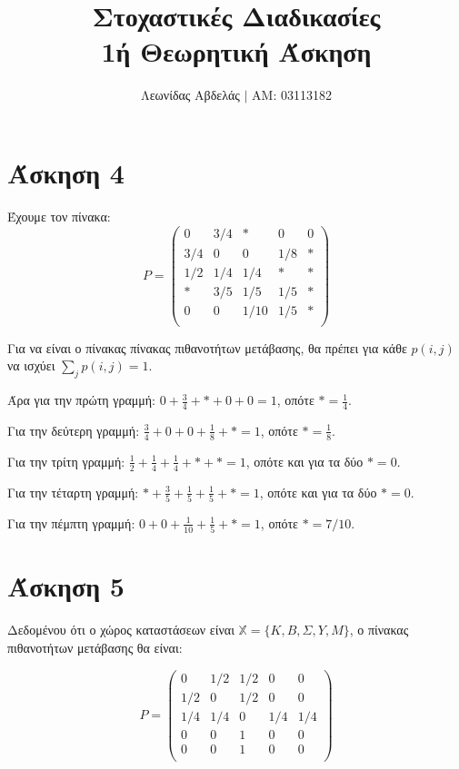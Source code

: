 \documentclass[11pt,a4paper]{article}
\title{Στοχαστικές Διαδικασίες \\
    1ή Θεωρητική Άσκηση}
\begin{document}
\date{}
\author{Λεωνίδας Αβδελάς $|$ ΑΜ: 03113182}

\maketitle

\section*{Άσκηση 4}

Έχουμε τον πίνακα:
\begin{equation*}
    P =
    \begin{pmatrix}
        0   & 3/4 & *    & 0   & 0 \\
        3/4 & 0   & 0    & 1/8 & * \\
        1/2 & 1/4 & 1/4  & *   & * \\
        *   & 3/5 & 1/5  & 1/5 & * \\
        0   & 0   & 1/10 & 1/5 & * \\
    \end{pmatrix}
\end{equation*}

Για να είναι ο πίνακας πίνακας πιθανοτήτων μετάβασης, θα πρέπει για κάθε $p(i,j)$ να ισχύει $\sum_{j}{p(i,j)} = 1$.

Άρα για την πρώτη γραμμή: $0 + \frac{3}{4} + * + 0 + 0 = 1$, οπότε $* = \frac{1}{4}$.

Για την δεύτερη γραμμή: $\frac{3}{4} + 0 + 0 + \frac{1}{8} + * = 1$, οπότε $* = \frac{1}{8}$.

Για την τρίτη γραμμή: $\frac{1}{2} + \frac{1}{4} + \frac{1}{4} + * + * = 1$, οπότε και για τα δύο $* = 0$.

Για την τέταρτη γραμμή: $* + \frac{3}{5} + \frac{1}{5} + \frac{1}{5} + * = 1$, οπότε και για τα δύο $* = 0$.

Για την πέμπτη γραμμή: $0 + 0 + \frac{1}{10} + \frac{1}{5} + * = 1$, οπότε $* = 7/10$.

\section*{Άσκηση 5}

Δεδομένου ότι ο χώρος καταστάσεων είναι $\mathbb{X} = \{K, B, Σ, Y, M\}$, ο πίνακας πιθανοτήτων μετάβασης θα είναι:

\begin{equation*}
    P =
    \begin{pmatrix}
        0   & 1/2 & 1/2 & 0   & 0   \\
        1/2 & 0   & 1/2 & 0   & 0   \\
        1/4 & 1/4 & 0   & 1/4 & 1/4 \\
        0   & 0   & 1   & 0   & 0   \\
        0   & 0   & 1   & 0   & 0   \\
    \end{pmatrix}
\end{equation*}
\end{document}
